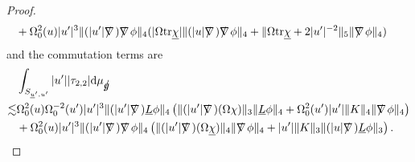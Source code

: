 \documentclass[11pt,reqno]{amsart}
\theoremstyle{definition}
\newtheorem{remark}{Remark}[section]
\numberwithin{equation}{section}
\newcommand{\D}{\mathrm{d}}
\newcommand{\tr}{\mathrm{tr}}
\def\chib{\underline{\chi}}
\def\Lb{\underline{L}}
\def\tr{\mathrm{tr}}
\def\ub{\underline{u}}
\def\nablas{\mbox{$\nabla \mkern -13mu /$ }}
\def\gs{\mbox{$g \mkern -9mu /$}}
\begin{document}
\begin{proof}
\begin{equation}
\begin{split}
&+\Omega_0^2(u)|u'|^3\|(|u'|\nablas)\nablas\phi\|_4(|\Omega\tr\chib|\|(|u|\nablas)\nablas\phi\|_4+\|\Omega\tr\chib+2|u'|^{-2}\|_5\|\nablas\phi\|_4)\
\end{split}
\end{equation}
and the commutation terms are
\begin{equation}\label{tau22}
\begin{split}
&\int_{S_{\ub',u'}}|u'||\tau_{2,2}|\D\mu_{\gs}\\
\lesssim&\Omega_0^2(u)\Omega_0^{-2}(u')|u'|^3\|(|u'|\nablas)\Lb\phi\|_4\left(\|(|u'|\nablas)(\Omega\chi)\|_3\|\Lb\phi\|_4+\Omega_0^2(u')|u'|\|K\|_4\|\nablas\phi\|_4\right)\\
&+\Omega_0^2(u)|u'|^3\|(|u'|\nablas)\nablas\phi\|_4\left(\|(|u'|\nablas)(\Omega\chib)\|_4\|\nablas\phi\|_4+|u'|\|K\|_3\|(|u|\nablas)\Lb\phi\|_3\right).
\end{split}
\end{equation}

\end{proof}
\end{document}
